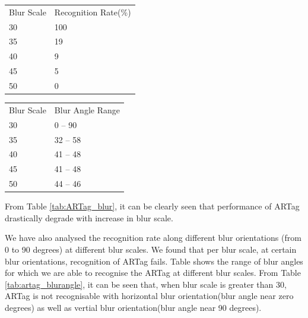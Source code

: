 \documentclass[runningheads]{llncs}
\begin{document}
\begin{minipage}{\textwidth}
  \begin{minipage}[b]{0.49\textwidth}
\centering
 \begin{tabularx}{0.75\textwidth}{|Y|Y|}
Blur Scale & Recognition Rate(\%) \\ 
30 & 100\\ 
35 & 19 \\ 
40 & 9 \\ 
45 & 5 \\ 
50 & 0 \\ 
\end{tabularx}
\label{tab:ARTag_blur}
 \end{minipage}	
 \begin{minipage}[b]{0.49\textwidth} 	
\centering
\begin{tabularx}{0.75\textwidth}{|Y|Y|}
Blur Scale & Blur Angle Range \\ 
30 & 0 -- 90\\ 
35 & 32 -- 58 \\ 
40 & 41 -- 48 \\ 
45 & 41 -- 48 \\ 
50 & 44 -- 46 \\ 
\end{tabularx}
\label{tab:artag_blurangle}
 \end{minipage}
\end{minipage}

From Table \ref{tab:ARTag_blur}, it can be clearly seen that performance of
ARTag drastically degrade with increase in blur scale.

We have also analysed the recognition rate along different blur orientations
(from 0 to 90 degrees) at different blur scales. We found that per blur scale,
at certain blur orientations, recognition of ARTag fails. Table shows the range
of blur angles for which we are able to recognise the ARTag at different blur
scales. From Table \ref{tab:artag_blurangle}, it can be seen that, when blur
scale is greater than 30, ARTag is not recognisable with horizontal blur
orientation(blur angle near zero degrees) as well as vertial blur
orientation(blur angle near 90 degrees).
\end{document}
